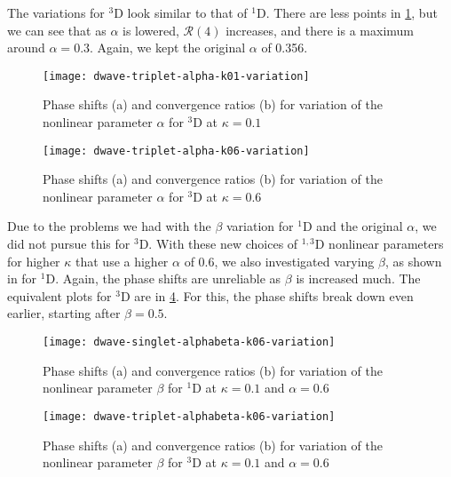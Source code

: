 \documentclass[Dissertation.tex]{subfiles}
\begin{document}
The variations for $^3$D look similar to that of $^1$D. There are less points
in \cref{fig:dwave-triplet-alpha-k01-variation}, but we can see that as
$\alpha$ is lowered, $\mathcal{R}(4)$ increases, and there is a maximum around
$\alpha = 0.3$. Again, we kept the original $\alpha$ of 0.356.

\begin{figure}[H]
	\centering
	\texttt{[image: dwave-triplet-alpha-k01-variation]}
	\caption[Variation of the nonlinear parameter $\alpha$ for $^{3}$D at $\kappa = 0.1$]{Phase shifts (a) and convergence ratios (b) for variation of the nonlinear parameter $\alpha$ for $^{3}$D at $\kappa = 0.1$}
	\label{fig:dwave-triplet-alpha-k01-variation}
\end{figure}



\begin{figure}[H]
	\centering
	\texttt{[image: dwave-triplet-alpha-k06-variation]}
	\caption[Variation of the nonlinear parameter $\alpha$ for $^{3}$D at $\kappa = 0.6$]{Phase shifts (a) and convergence ratios (b) for variation of the nonlinear parameter $\alpha$ for $^{3}$D at $\kappa = 0.6$}
	\label{fig:dwave-triplet-alpha-k06-variation}
\end{figure}

Due to the problems we had with the $\beta$ variation for $^1$D
and the original $\alpha$, we did not pursue this for $^3$D.
With these new choices of $^{1,3}$D nonlinear parameters for higher $\kappa$
that use a higher $\alpha$ of 0.6, we also investigated varying $\beta$, as
shown in  for $^1$D.
Again, the phase shifts are unreliable as $\beta$ is increased much.
The equivalent plots for $^3$D are in \cref{fig:dwave-triplet-alphabeta-k06-variation}.
For this, the phase shifts break down even earlier, starting after $\beta = 0.5$.

\begin{figure}[H]
	\centering
	\texttt{[image: dwave-singlet-alphabeta-k06-variation]}
	\caption[Variation of the nonlinear parameter $\beta$ for $^{1}$D at $\kappa = 0.1$ and $\alpha = 0.6$]{Phase shifts (a) and convergence ratios (b) for variation of the nonlinear parameter $\beta$ for $^{1}$D at $\kappa = 0.1$ and $\alpha = 0.6$}
	\label{fig:dwave-singlet-alphabeta-k06-variation}
\end{figure}

\begin{figure}[H]
	\centering
	\texttt{[image: dwave-triplet-alphabeta-k06-variation]}
	\caption[Variation of the nonlinear parameter $\beta$ for $^{3}$D at $\kappa = 0.1$ and $\alpha = 0.6$]{Phase shifts (a) and convergence ratios (b) for variation of the nonlinear parameter $\beta$ for $^{3}$D at $\kappa = 0.1$ and $\alpha = 0.6$}
	\label{fig:dwave-triplet-alphabeta-k06-variation}
\end{figure}
\end{document}
